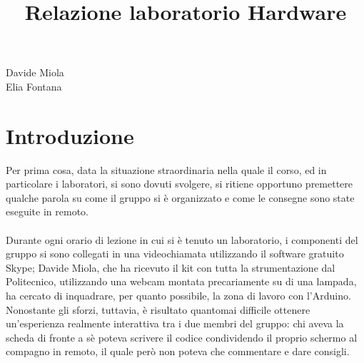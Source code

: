 \documentclass[12pt,a4paper]{article}
\begin{document}
\begin{figure}[b]
\centering

\end{figure}

\title{Relazione laboratorio Hardware}
\author{}
\maketitle
\vspace{10cm}
\begin{center}Davide Miola\\Elia Fontana\end{center}

\newpage
\setcounter{page}{1}
\rfoot{\thepage}
\section{Introduzione}

Per prima cosa, data la situazione straordinaria nella quale il corso, ed in particolare i laboratori, si sono dovuti svolgere, si ritiene opportuno premettere qualche parola su come il gruppo si è organizzato e come le consegne sono state eseguite in remoto.
\\ \\
Durante ogni orario di lezione in cui si è tenuto un laboratorio, i componenti del gruppo si sono collegati in una videochiamata utilizzando il software gratuito Skype; Davide Miola, che ha ricevuto il kit con tutta la strumentazione dal Politecnico, utilizzando una webcam montata precariamente su di una lampada, ha cercato di inquadrare, per quanto possibile, la zona di lavoro con l'Arduino. Nonostante gli sforzi, tuttavia, è risultato quantomai difficile ottenere un'esperienza realmente interattiva tra i due membri del gruppo: chi aveva la scheda di fronte a sè poteva scrivere il codice condividendo il proprio schermo al compagno in remoto, il quale però non poteva che commentare e dare consigli.
\end{document}

